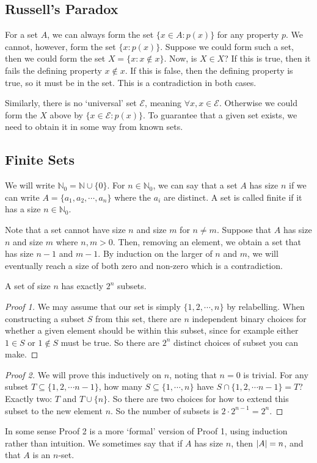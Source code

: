 \documentclass{article}
\begin{document}
	\subsection{Russell's Paradox}
	For a set $A$, we can always form the set $\{ x \in A: p(x) \}$ for any property $p$. We cannot, however, form the set $\{ x: p(x) \}$. Suppose we could form such a set, then we could form the set $X = \{ x: x \notin x \}$. Now, is $X \in X$? If this is true, then it fails the defining property $x \notin x$. If this is false, then the defining property is true, so it must be in the set. This is a contradiction in both cases.

	Similarly, there is no `universal' set $\mathscr E$, meaning $\forall x, x \in \mathscr E$. Otherwise we could form the $X$ above by $\{ x \in \mathscr E: p(x) \}$. To guarantee that a given set exists, we need to obtain it in some way from known sets.

	\subsection{Finite Sets}
	We will write $\mathbb N_0 = \mathbb N \cup \{ 0 \}$. For $n \in \mathbb N_0$, we can say that a set $A$ has size $n$ if we can write $A = \{ a_1, a_2, \cdots, a_n \}$ where the $a_i$ are distinct. A set is called finite if it has a size $n \in \mathbb N_0$.
	
	Note that a set cannot have size $n$ and size $m$ for $n \neq m$. Suppose that $A$ has size $n$ and size $m$ where $n, m > 0$. Then, removing an element, we obtain a set that has size $n-1$ and $m-1$. By induction on the larger of $n$ and $m$, we will eventually reach a size of both zero and non-zero which is a contradiction.

	\begin{proposition}
		A set of size $n$ has exactly $2^n$ subsets.
	\end{proposition}
	\begin{proof}[Proof 1]
		We may assume that our set is simply $\{ 1, 2, \cdots, n \}$ by relabelling. When constructing a subset $S$ from this set, there are $n$ independent binary choices for whether a given element should be within this subset, since for example either $1 \in S$ or $1 \notin S$ must be true. So there are $2^n$ distinct choices of subset you can make.
	\end{proof}
	\begin{proof}[Proof 2]
		We will prove this inductively on $n$, noting that $n=0$ is trivial. For any subset $T \subseteq \{ 1, 2, \cdots n-1 \}$, how many $S \subseteq \{ 1, \cdots, n \}$ have $S \cap \{ 1, 2, \cdots n-1 \} = T$? Exactly two: $T$ and $T \cup \{ n \}$. So there are two choices for how to extend this subset to the new element $n$. So the number of subsets is $2 \cdot 2^{n-1} = 2^n$.
	\end{proof}
	\noindent In some sense Proof 2 is a more `formal' version of Proof 1, using induction rather than intuition. We sometimes say that if $A$ has size $n$, then $\abs{A} = n$, and that $A$ is an $n$-set.
\end{document}
